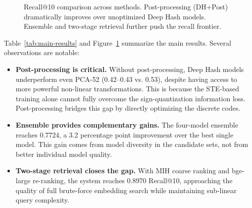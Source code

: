 \documentclass[11pt,a4paper]{article}
\begin{document}
\begin{figure}[htbp]
\centering
{}
\caption{Recall@10 comparison across methods. Post-processing (DH+Post) dramatically improves over unoptimized Deep Hash models. Ensemble and two-stage retrieval further push the recall frontier.}
\label{fig:main-results}
\end{figure}

Table~\ref{tab:main-results} and Figure~\ref{fig:main-results} summarize the main results. Several observations are notable:
\begin{itemize}[leftmargin=*]
    \item \textbf{Post-processing is critical.} Without post-processing, Deep Hash models underperform even PCA-52 (0.42--0.43 vs. 0.53), despite having access to more powerful non-linear transformations. This is because the STE-based training alone cannot fully overcome the sign-quantization information loss. Post-processing bridges this gap by directly optimizing the discrete codes.
    \item \textbf{Ensemble provides complementary gains.} The four-model ensemble reaches 0.7724, a 3.2 percentage point improvement over the best single model. This gain comes from model diversity in the candidate sets, not from better individual model quality.
    \item \textbf{Two-stage retrieval closes the gap.} With MIH coarse ranking and bge-large re-ranking, the system reaches 0.8970 Recall@10, approaching the quality of full brute-force embedding search while maintaining sub-linear query complexity.
\end{itemize}
\end{document}
